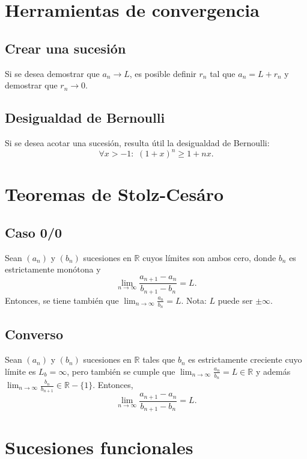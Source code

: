 \documentclass{article}
\begin{document}
\section*{Herramientas de convergencia}

\subsection*{Crear una sucesión}

Si se desea demostrar que $a_n\to L$, es posible definir $r_n$ tal que $a_n=L+r_n$ y demostrar que $r_n\to 0$.

\subsection*{Desigualdad de Bernoulli}

Si se desea acotar una sucesión, resulta útil la desigualdad de Bernoulli:
$$\forall x>-1: \hspace{4pt} (1+x)^n\geq 1+nx.$$

\section*{Teoremas de Stolz-Cesáro}

\subsection*{Caso 0/0}
Sean $(a_n)$ y $(b_n)$ sucesiones en $\mathbb{R}$ cuyos límites son ambos cero, donde $b_n$ es estrictamente monótona y
$$\lim_{n\to\infty}\frac{a_{n+1}-a_n}{b_{n+1}-b_n}=L.$$
Entonces, se tiene también que $\displaystyle\lim_{n\to\infty}\frac{a_n}{b_n}=L$. Nota: $L$ puede ser $\pm\infty$.

\subsection*{Converso}
Sean $(a_n)$ y $(b_n)$ sucesiones en $\mathbb{R}$ tales que $b_n$ es estrictamente creciente cuyo límite es $L_b=\infty$, pero también se cumple que $\displaystyle\lim_{n\to\infty}\frac{a_n}{b_n}=L\in\mathbb{R}$ y además $\displaystyle\lim_{n\to\infty}\frac{b_n}{b_{n+1}}\in\mathbb{R}-\{1\}$. Entonces,
$$\lim_{n\to\infty}\frac{a_{n+1}-a_n}{b_{n+1}-b_n}=L.$$

\section*{Sucesiones funcionales}
\end{document}
